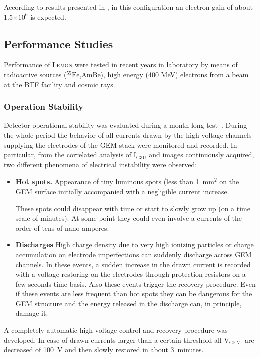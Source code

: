 \documentclass[physics,article,submit,moreauthors,pdftex]{Definitions/mdpi}
\newcommand{\fe}{\ensuremath{^{55}\textrm{Fe}}\xspace}
\newcommand{\ambe}{\ensuremath{\textrm{Am} \textrm{Be}}\xspace}
\newcommand{\lemon}{{\textsc{Lemon}}\xspace}
\newcommand{\Ig}  {I$_{\mathrm{G3U}}$\xspace}
\newcommand{\Vg}  {V$_{\mathrm{GEM}}$\xspace}
\begin{document}
According to results presented in \cite{bib:roby}, in this configuration an electron gain of about 1.5$\times 10^6$ is expected.

\subsection{Performance Studies}

Performance of \lemon were tested in recent years in laboratory by means of radioactive sources (\fe,\ambe), high energy (400 MeV) electrons from a beam at the BTF facility \cite{bib:btf1,bib:btf2} and cosmic rays.

\subsubsection{Operation Stability}

Detector operational stability was evaluated during a month long test~\cite{bib:fe55New}. 
During the whole period the behavior of all currents drawn by the high voltage channels supplying the electrodes of the GEM stack were monitored and recorded.
In particular, from the correlated analysis of \Ig and images continuously acquired, two different phenomena of electrical instability were observed:

\begin{itemize}
\item {\bf Hot spots.} Appearance of tiny luminous spots (less than 1~mm$^2$ on the GEM surface initially accompanied with a negligible current increase.

These spots could disappear with time or start to slowly grow up (on a time scale of minutes). At some point they could even involve a currents of the order of tens of nano-amperes.

\item{\bf Discharges} High charge density due to very high ionizing particles or charge accumulation on electrode imperfections can suddenly discharge across GEM channels. In these events, a sudden increase in the drawn current is recorded with a voltage restoring on the electrodes through protection resistors on a few seconds time basis. Also these events trigger the recovery procedure.
Even if these events are less frequent than hot spots 
they can be dangerous for the GEM structure and the energy released in the discharge can, in principle, damage it.

\end{itemize}

A completely automatic high voltage control and recovery procedure was developed. In case of drawn currents larger than a certain threshold all \Vg\ are decreased of 100~V and then slowly restored in about 3~minutes.
\end{document}
